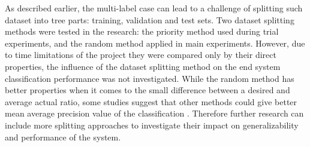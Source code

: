 As described earlier, the multi-label case can lead to a challenge of splitting such dataset into tree parts: training, validation and test sets. Two dataset splitting methods were tested in the research: the priority method used during trial experiments, and the random method applied in main experiments. However, due to time limitations of the project they were compared only by their direct properties, the influence of the dataset splitting method on the end system classification performance was not investigated. While the random method has better properties when it comes to the small difference between a desired and average actual ratio, some studies suggest that other methods could give better mean average precision value of the classification \cite{Sechidis2011OnData}. Therefore further research can include more splitting approaches to investigate their impact on generalizability and performance of the system.














